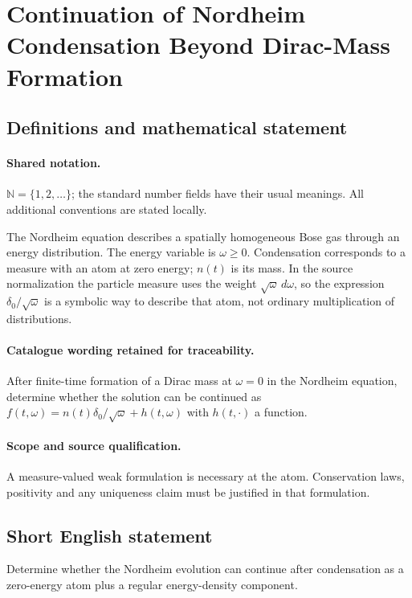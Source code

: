 \documentclass[11pt]{article}
\begin{document}
\section{Continuation of Nordheim Condensation Beyond Dirac-Mass Formation}\label{statement}

\subsection{Definitions and mathematical statement}

\paragraph{Shared notation.}$\mathbb N=\{1,2,\ldots\}$; the standard number fields have their usual meanings. All additional conventions are stated locally.


The Nordheim equation describes a spatially homogeneous Bose gas through an energy distribution. The energy variable is $\omega\geq0$. Condensation corresponds to a measure with an atom at zero energy; $n(t)$ is its mass. In the source normalization the particle measure uses the weight $\sqrt\omega\,d\omega$, so the expression $\delta_0/\sqrt\omega$ is a symbolic way to describe that atom, not ordinary multiplication of distributions.

\paragraph{Catalogue wording retained for traceability.}
After finite-time formation of a Dirac mass at $\omega=0$ in the Nordheim equation, determine whether the solution can be continued as $f(t,\omega)=n(t)\delta_0/\sqrt\omega+h(t,\omega)$ with $h(t,\cdot)$ a function.

\paragraph{Scope and source qualification.}A measure-valued weak formulation is necessary at the atom. Conservation laws, positivity and any uniqueness claim must be justified in that formulation.
\subsection{Short English statement}
Determine whether the Nordheim evolution can continue after condensation as a zero-energy atom plus a regular energy-density component.
\end{document}
